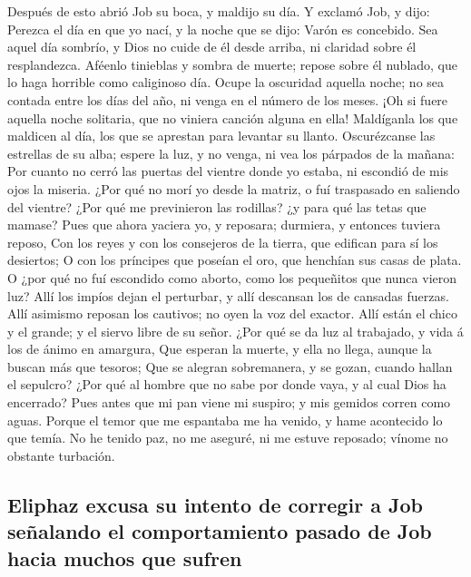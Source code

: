  Después de esto abrió Job su boca, y maldijo su día.
 Y exclamó Job, y dijo:  Perezca el día en
que yo nací, y la noche que se dijo: Varón es concebido. 
Sea aquel día sombrío, y Dios no cuide de él desde arriba, ni claridad
sobre él resplandezca.  Aféenlo tinieblas y sombra de
muerte; repose sobre él nublado, que lo haga horrible como caliginoso
día.  Ocupe la oscuridad aquella noche; no sea contada
entre los días del año, ni venga en el número de los meses.
 ¡Oh si fuere aquella noche solitaria, que no viniera
canción alguna en ella!  Maldíganla los que maldicen al
día, los que se aprestan para levantar su llanto. 
Oscurézcanse las estrellas de su alba; espere la luz, y no venga, ni vea
los párpados de la mañana:  Por cuanto no cerró las
puertas del vientre donde yo estaba, ni escondió de mis ojos la miseria.
 ¿Por qué no morí yo desde la matriz, o fuí traspasado en
saliendo del vientre?  ¿Por qué me previnieron las
rodillas? ¿y para qué las tetas que mamase?  Pues que
ahora yaciera yo, y reposara; durmiera, y entonces tuviera reposo,
 Con los reyes y con los consejeros de la tierra, que
edifican para sí los desiertos;  O con los príncipes que
poseían el oro, que henchían sus casas de plata.  O ¿por
qué no fuí escondido como aborto, como los pequeñitos que nunca vieron
luz?  Allí los impíos dejan el perturbar, y allí
descansan los de cansadas fuerzas.  Allí asimismo reposan
los cautivos; no oyen la voz del exactor.  Allí están el
chico y el grande; y el siervo libre de su señor.  ¿Por
qué se da luz al trabajado, y vida á los de ánimo en amargura,
 Que esperan la muerte, y ella no llega, aunque la buscan
más que tesoros;  Que se alegran sobremanera, y se gozan,
cuando hallan el sepulcro?  ¿Por qué al hombre que no
sabe por donde vaya, y al cual Dios ha encerrado?  Pues
antes que mi pan viene mi suspiro; y mis gemidos corren como aguas.
 Porque el temor que me espantaba me ha venido, y hame
acontecido lo que temía.  No he tenido paz, no me
aseguré, ni me estuve reposado; vínome no obstante turbación.

\hypertarget{eliphaz-excusa-su-intento-de-corregir-a-job-seuxf1alando-el-comportamiento-pasado-de-job-hacia-muchos-que-sufren}{%
\subsection{Eliphaz excusa su intento de corregir a Job señalando el
comportamiento pasado de Job hacia muchos que
sufren}\label{eliphaz-excusa-su-intento-de-corregir-a-job-seuxf1alando-el-comportamiento-pasado-de-job-hacia-muchos-que-sufren}}

